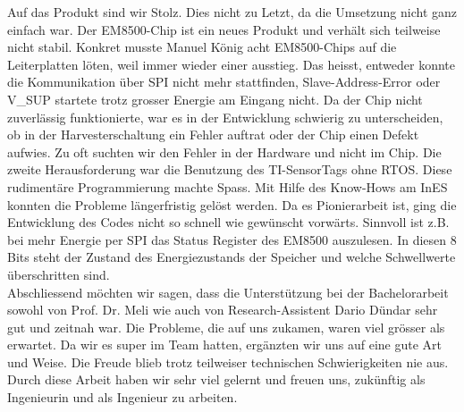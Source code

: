 Auf das Produkt sind wir Stolz. Dies nicht zu Letzt, da die Umsetzung nicht ganz einfach war. Der EM8500-Chip ist ein neues Produkt und verhält sich teilweise nicht stabil. Konkret musste Manuel König acht EM8500-Chips auf die Leiterplatten löten, weil immer wieder einer ausstieg. Das heisst, entweder konnte die Kommunikation über SPI nicht mehr stattfinden, Slave-Address-Error oder V\_SUP startete trotz grosser Energie am Eingang nicht. Da der Chip nicht zuverlässig funktionierte, war es in der Entwicklung schwierig zu unterscheiden, ob in der Harvesterschaltung ein Fehler auftrat oder der Chip einen Defekt aufwies. Zu oft suchten wir den Fehler in der Hardware und nicht im Chip. Die zweite Herausforderung war die Benutzung des TI-SensorTags ohne RTOS. Diese rudimentäre Programmierung machte Spass. Mit Hilfe des Know-Hows am InES konnten die Probleme längerfristig gelöst werden. Da es Pionierarbeit ist, ging die Entwicklung des Codes nicht so schnell wie gewünscht vorwärts. Sinnvoll ist z.B. bei mehr Energie per SPI das Status Register des EM8500 auszulesen. In diesen 8 Bits steht der Zustand des Energiezustands der Speicher und welche Schwellwerte überschritten sind.\\

Abschliessend möchten wir sagen, dass die Unterstützung bei der Bachelorarbeit sowohl von Prof. Dr. Meli wie auch von Research-Assistent Dario Dündar sehr gut und zeitnah war. Die Probleme, die auf uns zukamen, waren viel grösser als erwartet. Da wir es super im Team hatten, ergänzten wir uns auf eine gute Art und Weise. Die Freude blieb trotz teilweiser technischen Schwierigkeiten nie aus. Durch diese Arbeit haben wir sehr viel gelernt und freuen uns, zukünftig als Ingenieurin und als Ingenieur zu arbeiten.



